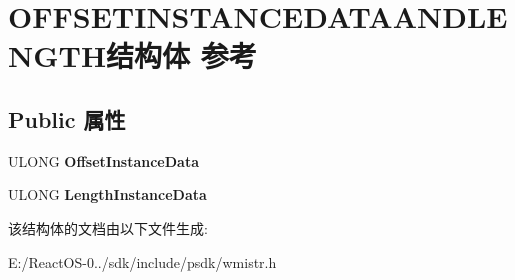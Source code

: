 \hypertarget{struct_o_f_f_s_e_t_i_n_s_t_a_n_c_e_d_a_t_a_a_n_d_l_e_n_g_t_h}{}\section{O\+F\+F\+S\+E\+T\+I\+N\+S\+T\+A\+N\+C\+E\+D\+A\+T\+A\+A\+N\+D\+L\+E\+N\+G\+T\+H结构体 参考}
\label{struct_o_f_f_s_e_t_i_n_s_t_a_n_c_e_d_a_t_a_a_n_d_l_e_n_g_t_h}
\subsection*{Public 属性}
\begin{DoxyCompactItemize}
\item 
\mbox{\label{struct_o_f_f_s_e_t_i_n_s_t_a_n_c_e_d_a_t_a_a_n_d_l_e_n_g_t_h_a61c566946111a350427b20e11a8cc0f9}} 
U\+L\+O\+NG {\bfseries Offset\+Instance\+Data}
\item 
\mbox{\label{struct_o_f_f_s_e_t_i_n_s_t_a_n_c_e_d_a_t_a_a_n_d_l_e_n_g_t_h_acea20440c7a148f721c5bb54e45b86d2}} 
U\+L\+O\+NG {\bfseries Length\+Instance\+Data}
\end{DoxyCompactItemize}


该结构体的文档由以下文件生成\+:\begin{DoxyCompactItemize}
\item 
E\+:/\+React\+O\+S-\/0../sdk/include/psdk/wmistr.\+h\end{DoxyCompactItemize}
